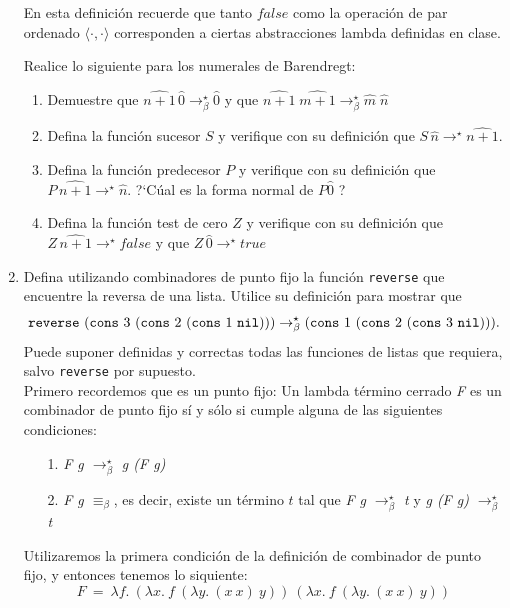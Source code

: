 \documentclass{article}
\begin{document}
\begin{enumerate}
        En esta definición recuerde que tanto $false$ como la operación de par ordenado $\langle\cdot,\cdot\rangle$ corresponden a ciertas abstracciones lambda definidas en clase.

        \medskip

        Realice lo siguiente para los numerales de Barendregt:

        \begin{enumerate}
            \item Demuestre que $\widehat{n+1}\,\widehat{0}\to^\star_\beta \widehat{0}$ y que $\widehat{n+1}\;\widehat{m+1}\to^\star_\beta \widehat{m}\;\widehat{n}$
            \item Defina la función sucesor $S$ y verifique con su definición que $S\,\widehat{n}\to^\star \widehat{n+1}$.
            \item Defina la función predecesor $P$ y verifique con su definición que $P\,\widehat{n+1}\to^\star \widehat{n}$. ?`Cúal es la forma normal de $P\widehat{0}$ ?
            \item Defina la función test de cero $Z$  y verifique con su definición que $Z\,\widehat{n+1}\to^\star false$ y que $Z\,\widehat{0}\to^\star true$
        \end{enumerate}

        \item Defina utilizando combinadores de punto fijo la función {\tt reverse} que encuentre la reversa de una lista. Utilice su definición para mostrar que $${\tt reverse}\,\, ({\tt cons}\,\, 3\,\, ({\tt cons}\,\, 2\,\, ({\tt cons}\,\, 1\,\, {\tt nil}))) \to^\star_\beta ({\tt cons}\,\, 1\,\, ({\tt cons}\,\, 2\,\, ({\tt cons}\,\, 3\,\, {\tt nil}))).$$ Puede suponer definidas y correctas todas las funciones de listas que requiera, salvo {\tt reverse} por supuesto.\\

        Primero recordemos que es un punto fijo: Un lambda término cerrado \textit{F} es un combinador de punto fijo sí y sólo si cumple alguna de las siguientes condiciones:

        \begin{enumerate}
            \item[1.] \textit{F g $\to^\star_\beta$ g (F g)}
            \item[2.] \textit{F g $\equiv_\beta$}, es decir, existe un término $t$ tal que \textit{F g $\to^\star_\beta$ t} y \textit{g (F g) $\to^\star_\beta$ t} 
        \end{enumerate}
         Utilizaremos la primera condición de la definición de combinador de punto fijo, y entonces tenemos lo siquiente:\\
         $$
            F\:=\:\lambda f.\:(\lambda x.\:f\:(\lambda y.\:(x\:x)\:y))\:(\lambda x.\:f\:(\lambda y.\:(x\:x)\:y))
         $$         


\end{enumerate}
\end{document}
